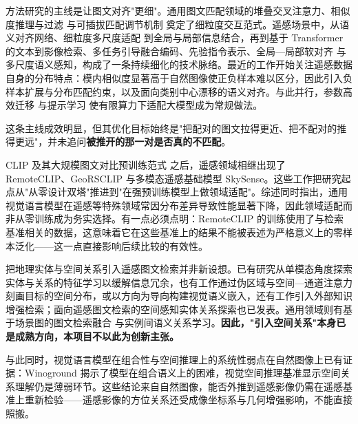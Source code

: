 
方法研究的主线是让图文对齐"更细"。通用图文匹配领域的堆叠交叉注意力\cite{lee2018scan}、相似度推理与过滤\cite{diao2021sgraf} 与可插拔匹配调节机制\cite{diao2023regulator} 奠定了细粒度交互范式。遥感场景中，从语义对齐网络\cite{cheng2021dsan}、细粒度多尺度适配\cite{yuan2022amfmn} 到全局与局部信息结合\cite{yuan2022galr}，再到基于 Transformer 的文本到影像检索\cite{rahhal2022multilanguage}、多任务引导融合编码\cite{fusionencoder2023}、先验指令表示\cite{pan2023pir}、全局—局部软对齐\cite{zhang2024glisa} 与多尺度语义感知\cite{mssa2025}，构成了一条持续细化的技术脉络。最近的工作开始关注遥感数据自身的分布特点：模内相似度显著高于自然图像使正负样本难以区分，因此引入负样本扩展与分布匹配约束\cite{dcca2026}，以及面向类别中心漂移的语义对齐\cite{cglsa2026}。与此并行，参数高效迁移\cite{yuan2023peft} 与提示学习\cite{zhou2022cocoop} 使有限算力下适配大模型成为常规做法。

这条主线成效明显，但其优化目标始终是"把配对的图文拉得更近、把不配对的推得更远"，并未追问\textbf{被推开的那一对是否真的不匹配}。


CLIP 及其大规模图文对比预训练范式\cite{radford2021clip} 之后，遥感领域相继出现了 RemoteCLIP\cite{liu2024remoteclip}、GeoRSCLIP\cite{zhang2024rs5m} 与多模态遥感基础模型 SkySense\cite{guo2024skysense}。这些工作把研究起点从"从零设计双塔"推进到"在强预训练模型上做领域适配"。综述同时指出，通用视觉语言模型在遥感等特殊领域常因分布差异导致性能显著下降\cite{li2024vlmrsmag,wuhui2026rsitr}，因此领域适配而非从零训练成为务实选择。有一点必须点明：RemoteCLIP 的训练使用了与检索基准相关的数据\cite{liu2024remoteclip}，这意味着它在这些基准上的结果不能被表述为严格意义上的零样本泛化——这一点直接影响后续比较的有效性。


把地理实体与空间关系引入遥感图文检索并非新设想。已有研究从单模态角度探索实体与关系的特征学习以缓解信息冗余\cite{zhang2023unimodal}，也有工作通过伪区域与空间—通道注意力刻画目标的空间分布\cite{wu2024scat}，或以方向为导向构建视觉语义嵌入\cite{yang2024dove}，还有工作引入外部知识增强检索\cite{mi2024knowledgeaware}；面向遥感图文检索的空间感知实体关系探索也已发表\cite{shui2025esrn}。通用领域则有基于场景图的图文检索融合\cite{sgfn2023} 与实例间语义关系学习\cite{pan2023semrel}。\textbf{因此，"引入空间关系"本身已是成熟方向，本项目不以此为创新主张。}

与此同时，视觉语言模型在组合性与空间推理上的系统性弱点在自然图像上已有证据：Winoground 揭示了模型在组合语义上的困难\cite{thrush2022winoground}，视觉空间推理基准显示空间关系理解仍是薄弱环节\cite{liu2023vsr}。这些结论来自自然图像，能否外推到遥感影像仍需在遥感基准上重新检验——遥感影像的方位关系还受成像坐标系与几何增强影响，不能直接照搬。

